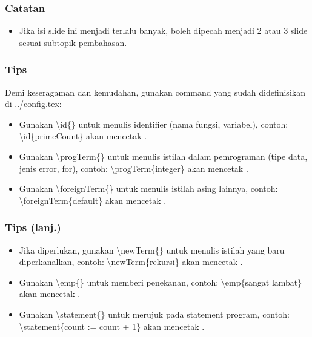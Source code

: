 \begin{frame}
\frametitle{Catatan}
\begin{itemize}
  \item Jika isi slide ini menjadi terlalu banyak, boleh dipecah menjadi 2 atau 3 slide sesuai subtopik pembahasan.
\end{itemize}
\end{frame}

\begin{frame}
\frametitle{Tips}
Demi keseragaman dan kemudahan, gunakan command yang sudah didefinisikan di ../config.tex:
\begin{itemize}
  \item Gunakan \textbackslash id\{\} untuk menulis identifier (nama fungsi, variabel), contoh: \textbackslash id\{primeCount\} akan mencetak .
  \item Gunakan \textbackslash progTerm\{\} untuk menulis istilah dalam pemrograman (tipe data, jenis error, for), contoh: \textbackslash progTerm\{integer\} akan mencetak .
  \item Gunakan \textbackslash foreignTerm\{\} untuk menulis istilah asing lainnya, contoh: \textbackslash foreignTerm\{default\} akan mencetak .
\end{itemize}
\end{frame}

\begin{frame}
\frametitle{Tips (lanj.)}
\begin{itemize}
  \item Jika diperlukan, gunakan \textbackslash newTerm\{\} untuk menulis istilah yang baru diperkanalkan, contoh: \textbackslash newTerm\{rekursi\} akan mencetak .
  \item Gunakan \textbackslash emp\{\} untuk memberi penekanan, contoh: \textbackslash emp\{sangat lambat\} akan mencetak .
  \item Gunakan \textbackslash statement\{\} untuk merujuk pada statement program, contoh: \textbackslash statement\{count := count + 1\} akan mencetak .
\end{itemize}
\end{frame}



